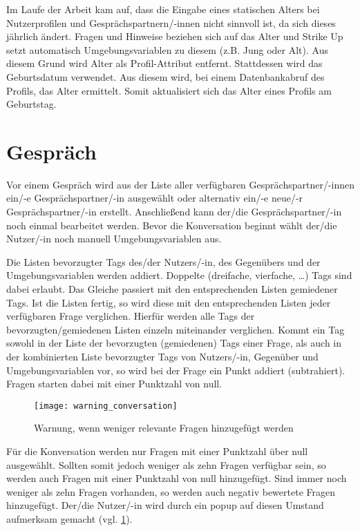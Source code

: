 Im Laufe der Arbeit kam auf, dass die Eingabe eines statischen Alters bei Nutzerprofilen und Gesprächspartnern/-innen nicht sinnvoll ist, da sich dieses jährlich ändert.
Fragen und Hinweise beziehen sich auf das Alter und Strike Up setzt automatisch Umgebungsvariablen zu diesem (z.B. Jung oder Alt). Aus diesem Grund wird Alter als Profil-Attribut entfernt.
Stattdessen wird das Geburtsdatum verwendet. Aus diesem wird, bei einem Datenbankabruf des Profils, das Alter ermittelt. Somit aktualisiert sich das Alter eines Profils am Geburtstag.


\section{Gespräch}
\label{sec:gespräch}

Vor einem Gespräch wird aus der Liste aller verfügbaren Gesprächspartner/-innen ein/-e Gesprächspartner/-in ausgewählt oder alternativ ein/-e neue/-r Gesprächspartner/-in erstellt.
Anschließend kann der/die Gesprächspartner/-in noch einmal bearbeitet werden. Bevor die Konversation beginnt wählt der/die Nutzer/-in noch manuell Umgebungsvariablen aus.

Die Listen bevorzugter Tags des/der Nutzers/-in, des Gegenübers und der Umgebungsvariablen werden addiert. Doppelte (dreifache, vierfache, \dots) Tags sind dabei erlaubt. Das Gleiche passiert
mit den entsprechenden Listen gemiedener Tags. \newline
Ist die Listen fertig, so wird diese mit den entsprechenden Listen jeder verfügbaren Frage verglichen. Hierfür werden alle Tags der bevorzugten/gemiedenen Listen einzeln
miteinander verglichen. \newline
Kommt ein Tag sowohl in der Liste der bevorzugten (gemiedenen) Tags einer Frage, als auch in der kombinierten Liste bevorzugter Tags von Nutzers/-in, Gegenüber und Umgebungsvariablen vor,
so wird bei der Frage ein Punkt addiert (subtrahiert). Fragen starten dabei mit einer Punktzahl von null.

\begin{figure}[htpb]
    \centering
    \texttt{[image: warning\_conversation]}
    \caption{Warnung, wenn weniger relevante Fragen hinzugefügt werden}
    \label{img:warning_conversation}
\end{figure}

Für die Konversation werden nur Fragen mit einer Punktzahl über null ausgewählt. Sollten somit jedoch weniger als zehn Fragen verfügbar sein, so werden auch Fragen mit einer Punktzahl von null
hinzugefügt. Sind immer noch weniger als zehn Fragen vorhanden, so werden auch negativ bewertete Fragen hinzugefügt. Der/die Nutzer/-in wird durch ein \gls{popup} auf diesen Umstand aufmerksam gemacht
(vgl. \ref{img:warning_conversation}).

